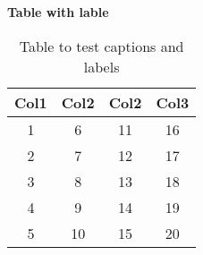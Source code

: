 \documentclass{article}
\begin{document}
\centering
\textbf{Table with lable}

\begin{table}[h!] %

\centering 
\begin{tabular}{||c | c | c | c||} 
\hline 

Col1 & Col2 & Col2 & Col3 \\ [2ex] 

\hline\hline 

1 & 6 & 11 & 16 \\ 

2 & 7 & 12 & 17 \\ 

3 & 8 & 13 & 18 \\ 

4 & 9 & 14 & 19 \\ 

5 & 10 & 15 & 20 \\ 

\hline 

\end{tabular} 

\caption{Table to test captions and labels} %

\label{table:data}


\end{table}
\end{document}
